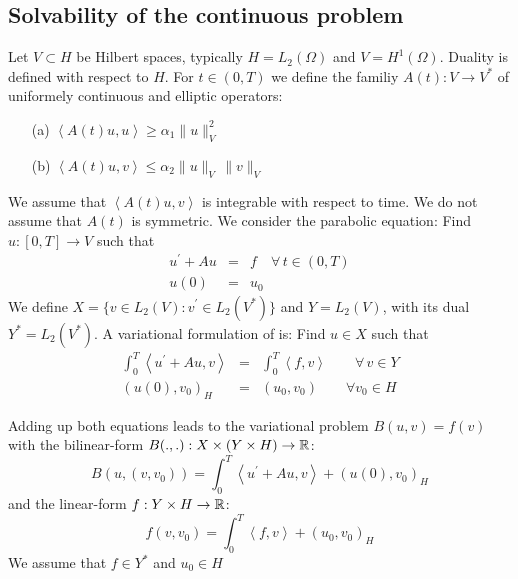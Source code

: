 \subsection{Solvability of the continuous problem}
%
Let $V \subset H$ be Hilbert spaces, typically $H = L_2(\Omega)$ and $V = H^1(\Omega)$. Duality is defined with respect to $H$.
For $t \in (0,T)$ we define the familiy $A(t) : V \rightarrow V^\ast$ of uniformely continuous and elliptic operators:
\begin{enumerate}
\item[(a)] $\left< A(t) u, u \right> \geq \alpha_1 \| u \|_V^2 $
\item[(b)] $\left< A(t) u, v \right> \leq \alpha_2 \| u \|_V  \, \| v \|_V$ 
\end{enumerate}
We assume that $\left< A(t) u, v \right>$ is integrable with respect to time. We do not assume that $A(t)$ is symmetric.
We consider the parabolic equation: Find $u : [0,T] \rightarrow V$ such that
\begin{eqnarray*}
u^\prime + A u & = & f  \quad \forall \, t \in (0,T) \\
u(0) & = & u_0
\end{eqnarray*}
We define $X = \{ v \in L_2(V) : v^\prime \in L_2(V^\ast) \} $ and $Y = L_2(V)$, with its dual $Y^\ast = L_2(V^\ast)$.
A variational formulation of is: Find $u \in X$ such that
\begin{eqnarray} 
\label{equ_parabolic1}
\int_0^T \left< u^\prime + A u, v \right> & = & \int_0^T \left< f, v \right>   \qquad \forall \, v \in Y \\
\label{equ_parabolic2}
(u(0), v_0)_H & = & (u_0, v_0) \qquad \forall v_0 \in H
\end{eqnarray}

Adding up both equations leads to the variational problem $B(u,v) = f(v)$ with the bilinear-form
$B(.,.) : X \times (Y \times H) \rightarrow {\mathbb R}$:
$$
B(u, (v,v_0)) = \int_0^T \left< u^\prime + A u, v \right> + (u(0), v_0)_H
$$
and the linear-form $f : Y \times H \rightarrow {\mathbb R}$:
$$
f(v,v_0) = \int_0^T \left< f, v \right> + (u_0, v_0)_H
$$ 
We assume that $f \in Y^\ast$ and $u_0 \in H$

